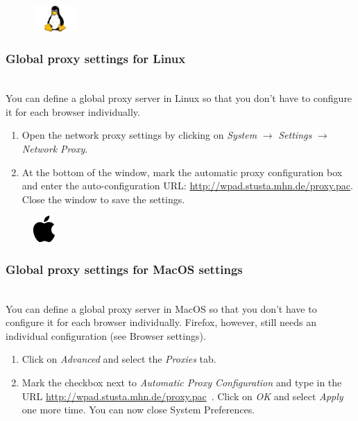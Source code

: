 \documentclass[a4paper,12pt]{scrartcl}
\begin{document}
\pagebreak

\begin{figure}[t!]
    \raggedleft
    \vspace{-20pt}
    \includegraphics[height=1cm,keepaspectratio]{Bilder/linux_logo_neu}
    \vspace{-30pt}
\end{figure}

\subsubsection*{Global proxy settings for Linux}

\\
You can define a global proxy server in Linux so that you don't have to configure it for each browser individually.
\begin{enumerate}
	\item Open the network proxy settings by clicking on \emph{System} $\rightarrow$ \emph{Settings} $\rightarrow$ \emph{Network Proxy}.
    \item At the bottom of the window, mark the automatic proxy configuration box and enter the auto-configuration URL: \url{http://wpad.stusta.mhn.de/proxy.pac}. Close the window to save the settings.
\end{enumerate}



\newpage
\enlargethispage{20pt}

\begin{figure}[t!]
    \raggedleft
    \vspace{-20pt}
    \includegraphics[height=1cm,keepaspectratio]{Bilder/apple_logo_neu}
    \vspace{-20pt}
\end{figure}
\subsubsection*{Global proxy settings for MacOS settings}

\\
You can define a global proxy server in MacOS so that you don't have to configure it for each browser individually. Firefox, however, still needs an individual configuration (see Browser settings).
\begin{enumerate}
	\item Click on \emph{Advanced} and select the \emph{Proxies} tab.
	\item Mark the checkbox next to \emph{Automatic Proxy Configuration} and type in the URL \url{http://wpad.stusta.mhn.de/proxy.pac}\ . Click on \emph{OK} and select \emph{Apply} one more time. You can now close System Preferences.
\end{enumerate}
\end{document}
